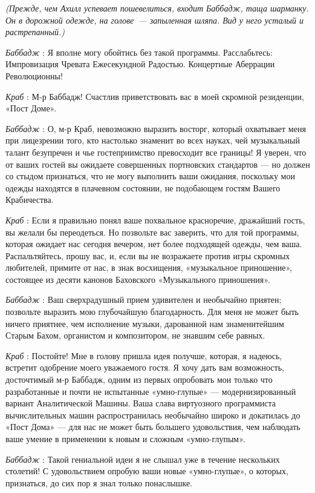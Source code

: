 \emph{(Прежде, чем Ахилл успевает пошевелиться, входит Баббадж, таща шарманку. Он в дорожной одежде, на голове~--- запыленная шляпа. Вид у него усталый и растрепанный.)}

\emph{Баббадж} : Я вполне могу обойтись без такой программы. Расслабьтесь: Импровизация Чревата Ежесекундной Радостью. Концертные Аберрации Революционны!

\emph{Краб} : М-р Баббадж! Счастлив приветствовать вас в моей скромной резиденции, «Пост Доме».

\emph{Баббадж} : О, м-р Краб, невозможно выразить восторг, который охватывает меня при лицезрении того, кто настолько знаменит во всех науках, чей музыкальный талант безупречен и чье гостеприимство превосходит все границы! Я уверен, что от ваших гостей вы ожидаете совершенных портновских стандартов --- но должен со стыдом признаться, что не могу выполнить ваши ожидания, поскольку мои одежды находятся в плачевном состоянии, не подобающем гостям Вашего Крабичества.

\emph{Краб} : Если я правильно понял ваше похвальное красноречие, дражайший гость, вы желали бы переодеться. Но позвольте вас заверить, что для той программы, которая ожидает нас сегодня вечером, нет более подходящей одежды, чем ваша. Распальтяйтесь, прошу вас, и, если вы не возражаете против игры скромных любителей, примите от нас, в знак восхищения, «музыкальное приношение», состоящее из десяти канонов Баховского «Музыкального приношения».

\emph{Баббадж} : Ваш сверхрадушный прием удивителен и необычайно приятен; позвольте выразить мою глубочайшую благодарность. Для меня не может быть ничего приятнее, чем исполнение музыки, дарованной нам знаменитейшим Старым Бахом, органистом и композитором, не знавшим себе равных.

\emph{Краб} : Постойте! Мне в голову пришла идея получше, которая, я надеюсь, встретит одобрение моего уважаемого гостя. Я хочу дать вам возможность, досточтимый м-р Баббадж, одним из первых опробовать мои только что разработанные и почти не испытанные «умно-глупые» --- модернизированный вариант Аналитической Машины. Ваша слава виртуозного программиста вычислительных машин распространилась необычайно широко и докатилась до «Пост Дома» --- для нас не может быть большего удовольствия, чем наблюдать ваше умение в применении к новым и сложным «умно-глупым».

\emph{Баббадж} : Такой гениальной идеи я не слышал уже в течение нескольких столетий! С удовольствием опробую ваши новые «умно-глупые», о которых, признаться, до сих пор я знал только понаслышке.

